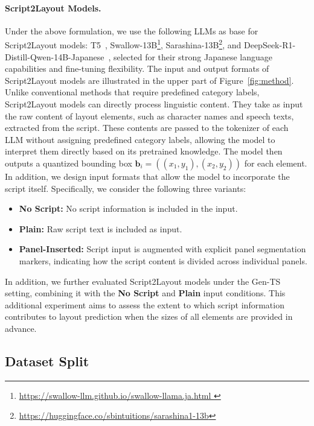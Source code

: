\vspace{-2.0em}
\paragraph{Script2Layout Models.}
Under the above formulation, we use the following LLMs as base for Script2Layout models: T5~\cite{raffel2020exploring_t5}, Swallow-13B\footnote{\url{https://swallow-llm.github.io/swallow-llama.ja.html }}, Sarashina-13B\footnote{\url{https://huggingface.co/sbintuitions/sarashina1-13b}}, and DeepSeek-R1-Distill-Qwen-14B-Japanese~\cite{deepseek-ai_deepseek-r1_2025}, selected for their strong Japanese language capabilities and fine-tuning flexibility. The input and output formats of Script2Layout models are illustrated in the upper part of Figure~\ref{fig:method}. Unlike conventional methods that require predefined category labels, Script2Layout models can directly process linguistic content. They take as input the raw content of layout elements, such as character names and speech texts, extracted from the script. These contents are passed to the tokenizer of each LLM without assigning predefined category labels, allowing the model to interpret them directly based on its pretrained knowledge. The model then outputs a quantized bounding box $\mathbf{b}_i = ((x_1, y_1), (x_2, y_2))$ for each element. In addition, we design input formats that allow the model to incorporate the script itself. Specifically, we consider the following three variants:
\begin{itemize}
  \item \textbf{No Script:} No script information is included in the input.
  \item \textbf{Plain:} Raw script text is included as input.
  \item \textbf{Panel-Inserted:} Script input is augmented with explicit panel segmentation markers, indicating how the script content is divided across individual panels.
\end{itemize}
In addition, we further evaluated Script2Layout models under the Gen-TS setting, combining it with the \textbf{No Script} and \textbf{Plain} input conditions. This additional experiment aims to assess the extent to which script information contributes to layout prediction when the sizes of all elements are provided in advance.

\subsection{Dataset Split}

